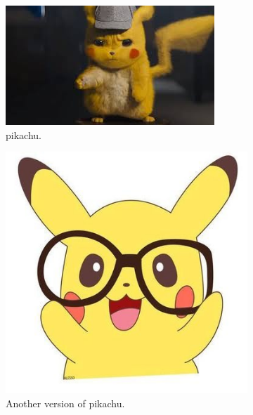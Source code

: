 \documentclass{article}
\begin{document}
  \begin{figure}[H]
    \centering
    \begin{subfigure}[t]{0.4\linewidth}
    \includegraphics[width=\linewidth]{anime.jpeg}
    \caption{pikachu.}
  \end{subfigure}
  \begin{subfigure}[t]{0.4\linewidth}
    \includegraphics[width=\linewidth]{pikachu.jpg}
    \caption{Another version of pikachu.}
  \end{subfigure}
  \begin{subfigure}[t]{0.5\linewidth}

\end{subfigure}
\end{figure}
\end{document}
